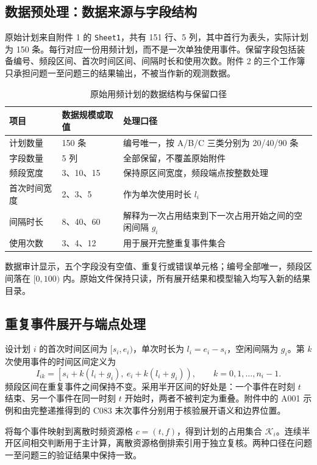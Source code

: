 \subsection{数据预处理：数据来源与字段结构}
原始计划来自附件 1 的 \texttt{Sheet1}，共有 151 行、5 列，其中首行为表头，实际计划为 150 条。每行对应一份用频计划，而不是一次单独使用事件。保留字段包括装备编号、频段区间、首次时间区间、间隔时长和使用次数。附件 2 的三个工作簿只承担问题一至问题三的结果输出，不被当作新的观测数据。

\begin{table}[H]
\centering
\caption{原始用频计划的数据结构与保留口径}
\label{tab:data-structure}
\begin{tabularx}{0.94\textwidth}{l l X}
\toprule
项目 & 数据规模或取值 & 处理口径 \\
\midrule
计划数量 & 150 条 & 编号唯一，按 A/B/C 三类分别为 20/40/90 条 \\
字段数量 & 5 列 & 全部保留，不覆盖原始附件 \\
频段宽度 & 3、10、15 & 保持原区间宽度，频段端点按整数处理 \\
首次时间宽度 & 2、3、5 & 作为单次使用时长 \(l_i\) \\
间隔时长 & 8、40、60 & 解释为一次占用结束到下一次占用开始之间的空闲间隔 \(g_i\) \\
使用次数 & 3、4、12 & 用于展开完整重复事件集合 \\
\bottomrule
\end{tabularx}
\end{table}

数据审计显示，五个字段没有空值、重复行或错误单元格；编号全部唯一，频段区间落在 \([0,100)\) 内。原始文件保持只读，所有展开结果和模型输入均写入新的结果目录。

\subsection{重复事件展开与端点处理}
设计划 \(i\) 的首次时间区间为 \([s_i,e_i)\)，单次时长为 \(l_i=e_i-s_i\)，空闲间隔为 \(g_i\)。第 \(k\) 次使用事件的时间区间定义为
\begin{equation}
I_{ik}=
\left[s_i+k(l_i+g_i),\ e_i+k(l_i+g_i)\right),
\qquad k=0,1,\ldots,n_i-1.
\label{eq:event-expansion}
\end{equation}
频段区间在重复事件之间保持不变。采用半开区间的好处是：一个事件在时刻 \(t\) 结束、另一个事件在同一时刻 \(t\) 开始时，两者不被判定为重叠。附件中的 A001 示例和由完整递推得到的 C083 末次事件分别用于核验展开语义和边界位置。

将每个事件映射到离散时频资源格 \(c=(t,f)\)，得到计划的占用集合 \(\mathcal K_i\)。连续半开区间相交判断用于主计算，离散资源格倒排索引用于独立复核。两种口径在问题一至问题三的验证结果中保持一致。

